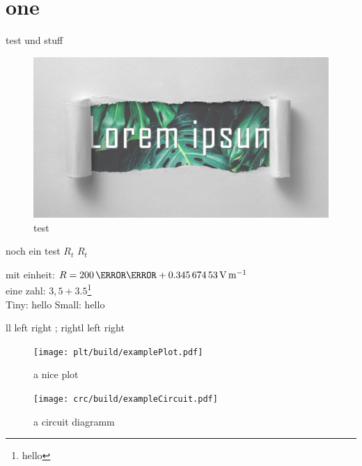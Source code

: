 \documentclass[twoside,f1]{HsH-report}
\begin{document}
\maketitle
\declarationAuthorship

\begin{abstract}
	\lipsum[5-8]
\end{abstract}

\tableofcontents

\cleardoublepage %

\chapter{one}
	\label{chap: one}
	{\color{red}test} und stuff
	\begin{figure}
		\centering
		\includegraphics[width=.6\textwidth]{img/lorem-ipsum.jpg}
		\caption{test}
	\end{figure}

	noch ein test \normalsubscripts$R_t$ \upsubscripts$R_t$

	mit einheit: $R=200\,\milli\ohm+ \SI{0.34567453}{\volt\per\metre}$
	\cite{laboranleitung:physik}
	\vspace{2cm}\\
	eine zahl: $3,5+3.5$\footnote[1]{hello}\\

	Tiny: {\tiny hello} Small: {\small hello}

	\makeatletter
	\newcommand{\test}[1][l]{
		{
			\def\t{#1}
			\if\t l left
			\else
				right
			\fi
		}
	}
	\test; \test[right]

	\lipsum[5-6]

	\pagebreak
	\begin{figure}
		\centering
		\texttt{[image: plt/build/examplePlot.pdf]}
		\caption{a nice plot}
	\end{figure}

	\begin{figure}
		\centering
		\texttt{[image: crc/build/exampleCircuit.pdf]}
		\caption{a circuit diagramm}
	\end{figure}
\end{document}
